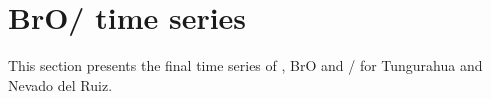 \documentclass  [
  paper    = a4,
  BCOR     = 10mm,
  twoside,
  fontsize = 12pt,
  fleqn,
  toc      = bibnumbered,
  toc      = listofnumbered,
  numbers  = noendperiod,
  headings = normal,
  listof   = leveldown,
  version  = 3.03
]                                       {scrreprt}
\begin{document}
\section{BrO/  time series}

This section presents the final time series of , BrO and /  for Tungurahua and Nevado del Ruiz.\\


\end{document}
